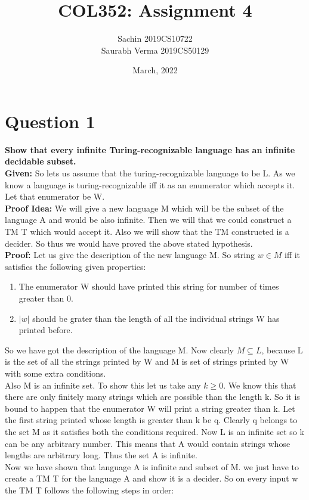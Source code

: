 \documentclass{article}
\title{COL352: Assignment 4}
\author{Sachin 2019CS10722 \\
        Saurabh Verma 2019CS50129\\}
\date{March, 2022}
\begin{document}
\maketitle

\section{Question 1}
\textbf{Show that every infinite Turing-recognizable language has an infinite decidable subset.}\\
\newline 
\textbf{Given:} So lets us assume that the turing-recognizable language to be L. As we know a language is turing-recognizable iff it as an enumerator which accepts it. Let that enumerator be W. \\
\textbf{Proof Idea:} We will give a new language M which will be the subset of the language A and would be also infinite. Then we will that we could construct a TM T which would accept it. Also we will show that the TM constructed is a decider. So thus we would have proved the above stated hypothesis. \\
\textbf{Proof:} Let us give the description of the new language M. So string $w \in M$ iff it satisfies the following given properties:
\begin{enumerate}
    \item The enumerator W should have printed this string for number of times greater than 0.
    \item $|w|$ should be grater than the length of all the individual strings W has printed before. 
\end{enumerate}
So we have got the description of the language M. Now clearly $M \subseteq L$, because L is the set of all the strings printed by W and M is set of strings printed by W with some extra conditions.\\
Also M is an infinite set. To show this let us take any $k \geq 0$. We know this that there are only finitely many strings which are possible than the length k. So it is bound to happen that the enumerator W will print a string greater than k. Let the first string printed whose length is greater than k be q. Clearly q belongs to the set M as it satisfies both the conditions required. Now L is an infinite set so k can be any arbitrary number. This means that A would contain strings whose lengths are arbitrary long. Thus the set A is infinite. \\
Now we have shown that language A is infinite and subset of M. we just have to create a TM T for the language A and show it is a decider. So on every input w the TM T follows the following steps in order:
\end{document}
